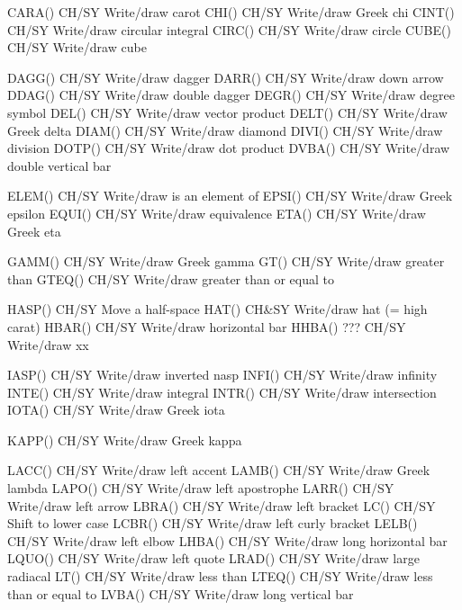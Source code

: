 CARA()                      CH/SY Write/draw carot
CHI()                       CH/SY Write/draw Greek chi
CINT()                      CH/SY Write/draw circular integral
CIRC()                      CH/SY Write/draw circle
CUBE()                      CH/SY Write/draw cube

DAGG()                      CH/SY Write/draw dagger
DARR()                      CH/SY Write/draw down arrow
DDAG()                      CH/SY Write/draw double dagger
DEGR()                      CH/SY Write/draw degree symbol
DEL()                       CH/SY Write/draw vector product
DELT()                      CH/SY Write/draw Greek delta
DIAM()                      CH/SY Write/draw diamond
DIVI()                      CH/SY Write/draw division
DOTP()                      CH/SY Write/draw dot product
DVBA()                      CH/SY Write/draw double vertical bar

ELEM()                      CH/SY Write/draw is an element of
EPSI()                      CH/SY Write/draw Greek epsilon
EQUI()                      CH/SY Write/draw equivalence
ETA()                       CH/SY Write/draw Greek eta

GAMM()                      CH/SY Write/draw Greek gamma
GT()                        CH/SY Write/draw greater than
GTEQ()                      CH/SY Write/draw greater than or equal to

HASP()                      CH/SY Move a half-space
HAT()                       CH&SY Write/draw hat (= high carat)
HBAR()                      CH/SY Write/draw horizontal bar
HHBA()  ???                 CH/SY Write/draw xx

IASP()                      CH/SY Write/draw inverted nasp
INFI()                      CH/SY Write/draw infinity
INTE()                      CH/SY Write/draw integral
INTR()                      CH/SY Write/draw intersection
IOTA()                      CH/SY Write/draw Greek iota

KAPP()                      CH/SY Write/draw Greek kappa

LACC()                      CH/SY Write/draw left accent
LAMB()                      CH/SY Write/draw Greek lambda
LAPO()                      CH/SY Write/draw left apostrophe
LARR()                      CH/SY Write/draw left arrow
LBRA()                      CH/SY Write/draw left bracket
LC()                        CH/SY Shift to lower case
LCBR()                      CH/SY Write/draw left curly bracket
LELB()                      CH/SY Write/draw left elbow
LHBA()                      CH/SY Write/draw long horizontal bar
LQUO()                      CH/SY Write/draw left quote
LRAD()                      CH/SY Write/draw large radiacal
LT()                        CH/SY Write/draw less than
LTEQ()                      CH/SY Write/draw less than or equal to
LVBA()                      CH/SY Write/draw long vertical bar

